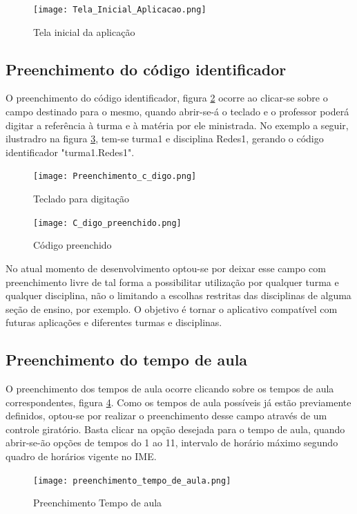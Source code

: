 \begin{figure}[!ht]
	\centering
\texttt{[image: Tela\_Inicial\_Aplicacao.png]}   
	\caption{Tela inicial da aplicação}
	\label{fig:figura64}
\end{figure}

\subsection{Preenchimento do código identificador}
O preenchimento do código identificador, figura \ref{fig:figura65} ocorre ao clicar-se sobre o campo destinado para o mesmo, quando abrir-se-á o teclado e o professor poderá digitar a referência à turma e à matéria por ele ministrada. No exemplo a seguir, ilustradro na figura \ref{fig:figura66}, tem-se turma1 e disciplina Redes1, gerando o código identificador "turma1.Redes1". 

\begin{figure}[!ht]
	\centering
\texttt{[image: Preenchimento\_c\_digo.png]}   
	\caption{Teclado para digitação}
	\label{fig:figura65}
\end{figure}

\begin{figure}[!ht]
	\centering
\texttt{[image: C\_digo\_preenchido.png]}   
	\caption{Código preenchido}
	\label{fig:figura66}
\end{figure}

No atual momento de desenvolvimento optou-se por deixar esse campo com preenchimento livre de tal forma a possibilitar utilização por qualquer turma e qualquer disciplina, não o limitando a escolhas restritas das disciplinas de alguma seção de ensino, por exemplo. O objetivo é tornar o aplicativo compatível com futuras aplicações e diferentes turmas e disciplinas.


\subsection{Preenchimento do tempo de aula}
O preenchimento dos tempos de aula ocorre clicando sobre os tempos de aula correspondentes, figura \ref{fig:figura57b}. Como os tempos de aula possíveis já estão previamente definidos, optou-se por realizar o preenchimento desse campo através de um controle giratório. Basta clicar na opção desejada para o tempo de aula, quando abrir-se-ão opções de tempos do 1 ao 11, intervalo de horário máximo segundo quadro de horários vigente no IME. 

\begin{figure}[!ht]
	\centering
\texttt{[image: preenchimento\_tempo\_de\_aula.png]}   
	\caption{Preenchimento Tempo de aula}
	\label{fig:figura57b}
\end{figure}

